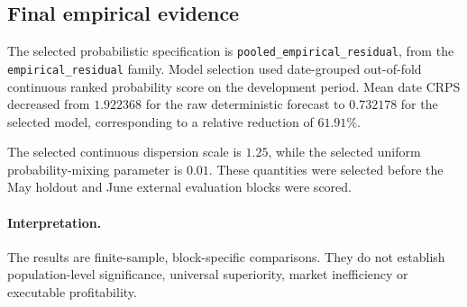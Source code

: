 \subsection{Final empirical evidence}

The selected probabilistic specification is
\texttt{pooled\_empirical\_residual}, from the
\texttt{empirical\_residual} family. Model selection used
date-grouped out-of-fold continuous ranked probability score on the
development period. Mean date CRPS decreased from
\(1.922368\) for the raw deterministic forecast to
\(0.732178\) for the selected model, corresponding to a
relative reduction of \(61.91\%\).

The selected continuous dispersion scale is
\(1.25\), while the selected uniform probability-mixing
parameter is \(0.01\). These quantities were selected
before the May holdout and June external evaluation blocks were scored.

\paragraph{Interpretation.}
The results are finite-sample, block-specific comparisons. They do not
establish population-level significance, universal superiority, market
inefficiency or executable profitability.










